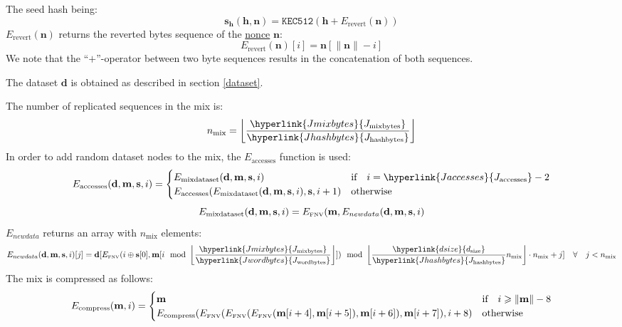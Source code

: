 \documentclass[9pt,oneside]{amsart}
\begin{document}
The seed hash being:
\begin{equation}
 \mathbf{s}_\mathbf{h}(\mathbf{h}, \mathbf{n}) = \texttt{KEC512}(\mathbf{h} + E_{\mathrm{revert}}(\mathbf{n}))
\end{equation}
$E_{\mathrm{revert}}(\mathbf{n})$ returns the reverted bytes sequence of the \hyperlink{block nonce}{nonce} $\mathbf{n}$:
\begin{equation}
 E_{\mathrm{revert}}(\mathbf{n})[i] = \mathbf{n}[\lVert \mathbf{n} \rVert -i]
\end{equation}
We note that the ``$+$''-operator between two byte sequences results in the concatenation of both sequences.

The dataset $\mathbf{d}$ is obtained as described in section \ref{dataset}.

The number of replicated sequences in the mix is:
\begin{equation}
 n_{\mathrm{mix}} =  \left\lfloor\frac{\hyperlink{Jmixbytes}{J_{\mathrm{mixbytes}}}}{\hyperlink{Jhashbytes}{J_{\mathrm{hashbytes}}}}\right\rfloor
\end{equation}
In order to add random dataset nodes to the mix, the $E_{\mathrm{accesses}}$ function is used:
\begin{equation}
 E_{\mathrm{accesses}}(\mathbf{d}, \mathbf{m}, \mathbf{s}, i) = \begin{cases}
E_{\mathrm{mixdataset}}(\mathbf{d}, \mathbf{m},  \mathbf{s}, i) & \text{if} \quad i = \hyperlink{Jaccesses}{J_{\mathrm{accesses}}} -2 \\
E_{\mathrm{accesses}}(E_{\mathrm{mixdataset}}(\mathbf{d}, \mathbf{m}, \mathbf{s}, i), \mathbf{s}, i + 1) & \text{otherwise}
\end{cases}
\end{equation}
\begin{equation}
 E_{\mathrm{mixdataset}}(\mathbf{d}, \mathbf{m}, \mathbf{s}, i) = E_\text{\tiny FNV}(\mathbf{m}, E_{newdata}(\mathbf{d}, \mathbf{m}, \mathbf{s}, i)
\end{equation}
$E_{newdata}$ returns an array with $n_{\mathrm{mix}}$ elements:
\begin{equation}
 E_{newdata}(\mathbf{d}, \mathbf{m}, \mathbf{s}, i)[j] = \mathbf{d}[E_\text{\tiny FNV}(i \oplus \mathbf{s}[0], \mathbf{m}[i \mod \left\lfloor\frac{\hyperlink{Jmixbytes}{J_{\mathrm{mixbytes}}}}{\hyperlink{Jwordbytes}{J_{\mathrm{wordbytes}}}}\right\rfloor]) \mod \left\lfloor\frac{\hyperlink{dsize}{d_{\mathrm{size}}}}{\hyperlink{Jhashbytes}{J_{\mathrm{hashbytes}}}}{n_{\mathrm{mix}}}\right\rfloor \cdot n_{\mathrm{mix}} + j] \quad \forall \quad j < n_{\mathrm{mix}}
\end{equation}
The mix is compressed as follows:
\begin{equation}
 E_{\mathrm{compress}}(\mathbf{m}, i) = \begin{cases}
\mathbf{m} & \text{if} \quad i \geqslant \lVert \mathbf{m} \rVert - 8 \\
E_{\mathrm{compress}}(E_\text{\tiny FNV}(E_\text{\tiny FNV}(E_\text{\tiny FNV}(\mathbf{m}[i + 4], \mathbf{m}[i + 5]), \mathbf{m}[i + 6]), \mathbf{m}[i + 7]), i + 8) & \text{otherwise}
\end{cases}
\end{equation}
\end{document}
